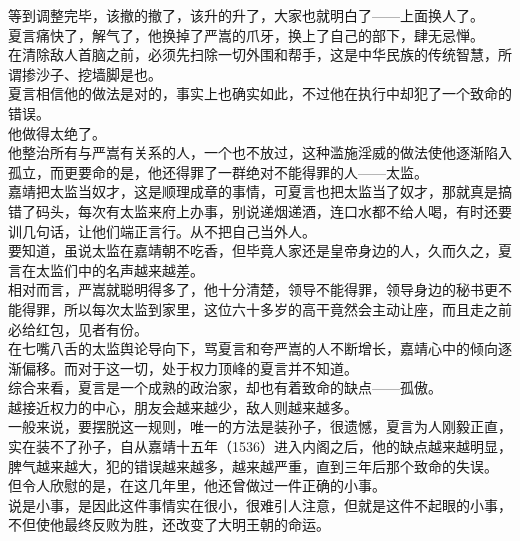 \begin{multicols}{\theparacolNo}
等到调整完毕，该撤的撤了，该升的升了，大家也就明白了——上面换人了。\\

夏言痛快了，解气了，他换掉了严嵩的爪牙，换上了自己的部下，肆无忌惮。\\

在清除敌人首脑之前，必须先扫除一切外围和帮手，这是中华民族的传统智慧，所谓掺沙子、挖墙脚是也。\\

夏言相信他的做法是对的，事实上也确实如此，不过他在执行中却犯了一个致命的错误。\\

他做得太绝了。\\

他整治所有与严嵩有关系的人，一个也不放过，这种滥施淫威的做法使他逐渐陷入孤立，而更要命的是，他还得罪了一群绝对不能得罪的人——太监。\\

嘉靖把太监当奴才，这是顺理成章的事情，可夏言也把太监当了奴才，那就真是搞错了码头，每次有太监来府上办事，别说递烟递酒，连口水都不给人喝，有时还要训几句话，让他们端正言行。从不把自己当外人。\\

要知道，虽说太监在嘉靖朝不吃香，但毕竟人家还是皇帝身边的人，久而久之，夏言在太监们中的名声越来越差。\\

相对而言，严嵩就聪明得多了，他十分清楚，领导不能得罪，领导身边的秘书更不能得罪，所以每次太监到家里，这位六十多岁的高干竟然会主动让座，而且走之前必给红包，见者有份。\\

在七嘴八舌的太监舆论导向下，骂夏言和夸严嵩的人不断增长，嘉靖心中的倾向逐渐偏移。而对于这一切，处于权力顶峰的夏言并不知道。\\

综合来看，夏言是一个成熟的政治家，却也有着致命的缺点——孤傲。\\

越接近权力的中心，朋友会越来越少，敌人则越来越多。\\

一般来说，要摆脱这一规则，唯一的方法是装孙子，很遗憾，夏言为人刚毅正直，实在装不了孙子，自从嘉靖十五年（1536）进入内阁之后，他的缺点越来越明显，脾气越来越大，犯的错误越来越多，越来越严重，直到三年后那个致命的失误。\\

但令人欣慰的是，在这几年里，他还曾做过一件正确的小事。\\

说是小事，是因此这件事情实在很小，很难引人注意，但就是这件不起眼的小事，不但使他最终反败为胜，还改变了大明王朝的命运。\\


\end{multicols}
